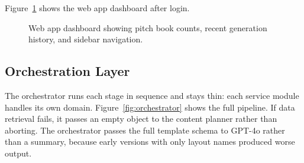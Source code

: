 Figure~\ref{fig:dashboard} shows the web app dashboard after login.

\begin{figure}[H]
\centering
{}
\caption{Web app dashboard showing pitch book counts, recent generation history, and sidebar navigation.}
\label{fig:dashboard}
\end{figure}

\subsection{Orchestration Layer}

The orchestrator runs each stage in sequence and stays thin: each service module handles its own domain. Figure~\ref{fig:orchestrator} shows the full pipeline. If data retrieval fails, it passes an empty object to the content planner rather than aborting. The orchestrator passes the full template schema to GPT-4o rather than a summary, because early versions with only layout names produced worse output.

